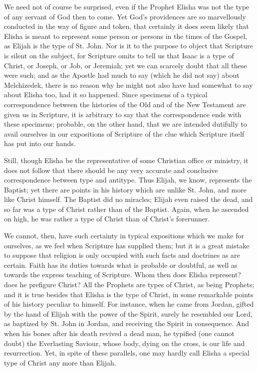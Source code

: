 We need not of course be surprised, even if the Prophet Elisha was
not the type of any servant of God then to come. Yet God's providences
are so marvellously conducted in the way of figure and token, that
certainly it does seem likely that Elisha is meant to represent some
person or persons in the times of the Gospel, as Elijah is the type of
St. John. Nor is it to the purpose to object that Scripture is silent
on the subject, for Scripture omits to tell us that Isaac is a type of
Christ, or Joseph, or Job, or Jeremiah; yet we can scarcely doubt that
all these were such; and as the Apostle had much to say (which he did
not say) about Melchizedek, there is no reason why he might not also
have had somewhat to say about Elisha too, had it so happened. Since
specimens of a typical correspondence between the histories of the Old
and of the New Testament are given us in Scripture, it is arbitrary to
say that the correspondence ends with these specimens; probable, on
the other hand, that we are intended dutifully to avail ourselves in
our expositions of Scripture of the clue which Scripture itself has
put into our hands.

Still, though Elisha be the representative of some Christian office
or ministry, it does not follow that there should be any very accurate
and conclusive correspondence between type and antitype. Thus Elijah,
we know, represents the Baptist; yet there are points in his history
which are unlike St. John, and more like Christ himself. The Baptist
did no miracles; Elijah even raised the dead, and so far was a type of
Christ rather than of the Baptist. Again, when he ascended on high, he
was rather a type of Christ than of Christ's forerunner.

We cannot, then, have such certainty in typical expositions which
we make for ourselves, as we feel when Scripture has supplied them;
but it is a great mistake to suppose that religion is only occupied
with such facts and doctrines as are certain. Faith has its duties
towards what is probable or doubtful, as well as towards the express
teaching of Scripture. Whom then does Elisha represent? does he
prefigure Christ? All the Prophets are types of Christ, as being
Prophets; and it is true besides that Elisha is the type of Christ, in
some remarkable points of his history peculiar to himself. For
instance, when he came from Jordan, gifted by the hand of Elijah with
the power of the Spirit, surely he resembled our Lord, as baptized by
St. John in Jordan, and receiving the Spirit in consequence. And when
his bones after his death revived a dead man, he typified (one cannot
doubt) the Everlasting Saviour, whose body, dying on the cross, is our
life and resurrection. Yet, in spite of these parallels, one may
hardly call Elisha a special type of Christ any more than Elijah.


